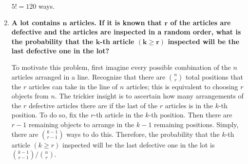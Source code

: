 \documentclass[10pt, oneside]{article}   	%
\theoremstyle{definition}
\begin{document}
\begin{enumerate}[label=2.\arabic*]
  $5! = \boxed{120}$ ways.
  
\item \begin{tcolorbox}[
  colback=Cerulean!5!white,
  colframe=Cerulean!75!black]
  \textbf{A lot contains $\bm{n}$ articles. If it is known that $\bm{r}$ of the articles are defective and the articles are inspected in a random order, what is the probability that the $\bm{k}$-th article $\bm{(k \geq r)}$ inspected will be the last defective one in the lot?}
  \end{tcolorbox}
  
  To motivate this problem, first imagine every possible combination of the $n$ articles arranged in a line. Recognize that there are $\binom{n}{r}$ total positions that the $r$ articles can take in the line of $n$ articles; this is equivalent to choosing $r$ objects from $n$. The trickier insight is to ascertain how many arrangements of the $r$ defective articles there are if the last of the $r$ articles is in the $k$-th position. To do so, fix the $r$-th article in the $k$-th position. Then there are $r-1$ remaining objects to arrange in the $k-1$ remaining positions. Simply, there are $\binom{k-1}{r-1}$ ways to do this. Therefore, the probability that the $k$-th article $(k \geq r)$ inspected will be the last defective one in the lot is $\boxed{\binom{k-1}{r-1} / \binom{n}{r}}$.
\end{enumerate}
\end{document}
